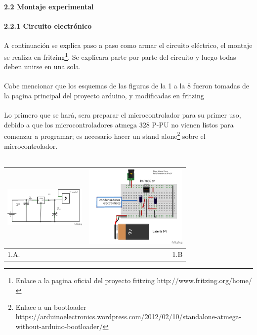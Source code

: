 \documentclass[12]{article}
\newenvironment{Figure}
{\par\medskip\noindent\minipage{\linewidth}}
{\endminipage\par\medskip}
\begin{document}
\begin{multicols}{2}
{\bf{2.2 Montaje experimental}}\\\\
{\bf{2.2.1 Circuito electrónico}}\\\\
A continuación se explica paso a paso como armar el circuito eléctrico, el montaje se realiza en fritzing\footnote{Enlace a la pagina oficial del proyecto fritzing http://www.fritzing.org/home/}. Se explicara parte por parte del circuito y luego todas deben unirse en una sola.\\\\
Cabe mencionar que los esquemas de las figuras de la 1 a la 8 fueron tomadas de la pagina principal del proyecto arduino\cite{ARDUINO}, y modificadas en fritzing\cite{FRITZING}  \\\\
Lo primero que se hará, sera preparar el microcontrolador para su primer uso, debido a que los microcontroladores atmega 328 P-PU no vienen listos para comenzar a programar; es necesario hacer un stand alone\footnote{Enlace a un bootloader https://arduinoelectronics.wordpress.com/2012/02/10/standalone-atmega-without-arduino-bootloader/} sobre el microcontrolador.\\\\


\begin{Figure}
\center
\begin{tabular}{|l|r|}
\hline
\includegraphics[width=4cm, height=4cm]{img/esquematrans.png}  & \includegraphics[width=4.cm, height=4cm]{img/montajetr5V.png} \\ \hline
1.A. & 1.B \\ \hline
\end{tabular}
\label{fig:g1}
\end{Figure}
\vspace{0.2cm}


\end{multicols}
\end{document}
